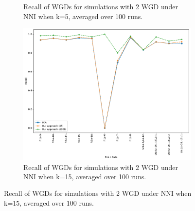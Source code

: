 \documentclass[10pt]{article}
\begin{document}
\begin{figure}[h!]
\begin{subfigure}[b]{0.31\textwidth}
        \caption{Recall of WGDs for simulations with 2 WGD under NNI when k=5, averaged over 100 runs.}
        \label{fig:recall-NNI-k5-2wgd}
    \end{subfigure}
    \hfill
    \begin{subfigure}[b]{0.31\textwidth}
        \centering
        \includegraphics[width=\textwidth]{figs/recall-2W-NNI-K15-WGD-t20-t80-Avg.pdf}
        \caption{Recall of WGDs for simulations with 2 WGD under NNI when k=15, averaged over 100 runs.}
        \label{fig:recall-NNI-k15-2wgd}
    \end{subfigure}
    
    \vspace{1em} %


\end{figure}
\end{document}
